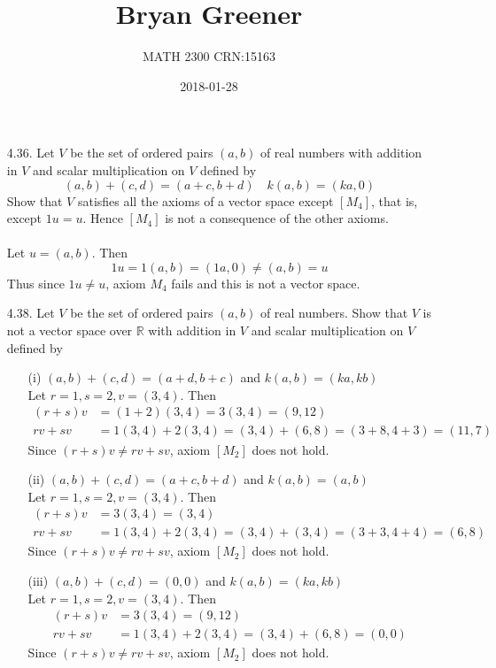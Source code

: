 \documentclass[12pt]{article}
\title{Bryan Greener}
\author{MATH 2300 CRN:15163}
\date{2018-01-28}
\begin{document}
\maketitle

\TabPositions{4cm}

\begin{enumerate}
\item[4.36.] Let $V$ be the set of ordered pairs $(a,b)$ of real numbers with addition in $V$ and scalar multiplication on $V$ defined by
			\[ (a,b) + (c,d) = (a+c,b+d) \quad k(a,b) = (ka,0) \]
			Show that $V$ satisfies all the axioms of a vector space except $[M_4]$, that is, except $1u=u$. Hence $[M_4]$ is not a consequence of the other axioms.\\~\\
			Let $u=(a,b)$. Then
			\[ 1u = 1(a,b) = (1a, 0) \neq (a,b) = u \]
			Thus since $1u \neq u$, axiom $M_4$ fails and this is not a vector space.
			
\item[4.38.] Let $V$ be the set of ordered pairs $(a,b)$ of real numbers. Show that $V$ is not a vector space over $\mathbb{R}$ with addition in $V$ and scalar multiplication on $V$ defined by
	\begin{enumerate}
	\item[(i)] $(a,b)+(c,d)=(a+d,b+c)$ and $k(a,b)=(ka,kb)$\\
		Let $r=1,s=2,v=(3,4)$. Then
		\begin{align*}
		(r+s)v &= (1+2)(3,4) = 3(3,4) = (9,12)\\
		rv + sv &= 1(3,4) + 2(3,4) = (3,4) + (6,8) = (3+8,4+3) = (11,7)
		\end{align*}
		Since $(r+s)v \neq rv + sv$, axiom $[M_2]$ does not hold.\\
		
	\item[(ii)] $(a,b)+(c,d)=(a+c,b+d)$ and $k(a,b)=(a,b)$\\
		Let $r=1,s=2,v=(3,4)$. Then
		\begin{align*}
		(r+s)v &= 3(3,4) = (3,4)\\
		rv + sv &= 1(3,4) + 2(3,4) = (3,4) + (3,4) = (3+3,4+4) = (6,8)
		\end{align*}
		Since $(r+s)v \neq rv + sv$, axiom $[M_2]$ does not hold.\\
		
	\item[(iii)] $(a,b)+(c,d)=(0,0)$ and $k(a,b)=(ka,kb)$\\
		Let $r=1,s=2,v=(3,4)$. Then
		\begin{align*}
		(r+s)v &= 3(3,4) = (9,12)\\
		rv + sv &= 1(3,4) + 2(3,4) = (3,4) + (6,8) = (0,0)
		\end{align*}
		Since $(r+s)v \neq rv + sv$, axiom $[M_2]$ does not hold.\\
	

\end{enumerate}
\end{enumerate}
\end{document}
